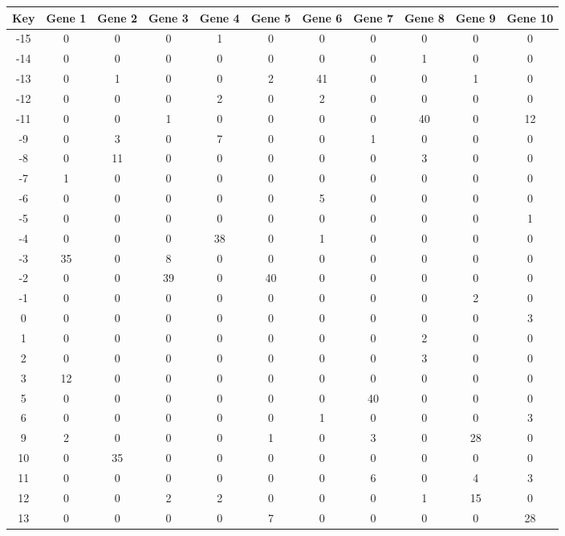 \begin{tabular}{|c|c|c|c|c|c|c|c|c|c|c|}
\hline
Key & Gene 1 & Gene 2 & Gene 3 & Gene 4 & Gene 5 & Gene 6 & Gene 7 & Gene 8 & Gene 9 & Gene 10 \\
\hline
-15 & 0 & 0 & 0 & 1 & 0 & 0 & 0 & 0 & 0 & 0 \\
-14 & 0 & 0 & 0 & 0 & 0 & 0 & 0 & 1 & 0 & 0 \\
-13 & 0 & 1 & 0 & 0 & 2 & 41 & 0 & 0 & 1 & 0 \\
-12 & 0 & 0 & 0 & 2 & 0 & 2 & 0 & 0 & 0 & 0 \\
-11 & 0 & 0 & 1 & 0 & 0 & 0 & 0 & 40 & 0 & 12 \\
-9 & 0 & 3 & 0 & 7 & 0 & 0 & 1 & 0 & 0 & 0 \\
-8 & 0 & 11 & 0 & 0 & 0 & 0 & 0 & 3 & 0 & 0 \\
-7 & 1 & 0 & 0 & 0 & 0 & 0 & 0 & 0 & 0 & 0 \\
-6 & 0 & 0 & 0 & 0 & 0 & 5 & 0 & 0 & 0 & 0 \\
-5 & 0 & 0 & 0 & 0 & 0 & 0 & 0 & 0 & 0 & 1 \\
-4 & 0 & 0 & 0 & 38 & 0 & 1 & 0 & 0 & 0 & 0 \\
-3 & 35 & 0 & 8 & 0 & 0 & 0 & 0 & 0 & 0 & 0 \\
-2 & 0 & 0 & 39 & 0 & 40 & 0 & 0 & 0 & 0 & 0 \\
-1 & 0 & 0 & 0 & 0 & 0 & 0 & 0 & 0 & 2 & 0 \\
0 & 0 & 0 & 0 & 0 & 0 & 0 & 0 & 0 & 0 & 3 \\
1 & 0 & 0 & 0 & 0 & 0 & 0 & 0 & 2 & 0 & 0 \\
2 & 0 & 0 & 0 & 0 & 0 & 0 & 0 & 3 & 0 & 0 \\
3 & 12 & 0 & 0 & 0 & 0 & 0 & 0 & 0 & 0 & 0 \\
5 & 0 & 0 & 0 & 0 & 0 & 0 & 40 & 0 & 0 & 0 \\
6 & 0 & 0 & 0 & 0 & 0 & 1 & 0 & 0 & 0 & 3 \\
9 & 2 & 0 & 0 & 0 & 1 & 0 & 3 & 0 & 28 & 0 \\
10 & 0 & 35 & 0 & 0 & 0 & 0 & 0 & 0 & 0 & 0 \\
11 & 0 & 0 & 0 & 0 & 0 & 0 & 6 & 0 & 4 & 3 \\
12 & 0 & 0 & 2 & 2 & 0 & 0 & 0 & 1 & 15 & 0 \\
13 & 0 & 0 & 0 & 0 & 7 & 0 & 0 & 0 & 0 & 28 \\
\hline
\end{tabular}